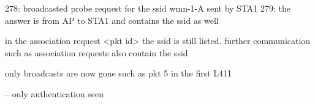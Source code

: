 278: broadcasted probe request for the ssid wmn-1-A sent by STA1
279: the answer is from AP to STA1 and contains the ssid as well

in the association request <pkt id> the ssid is still listed. 
further communication such as association requests also contain the ssid

only broadcasts are now gone such as pkt 5 in the first L411


-- only authentication seen

